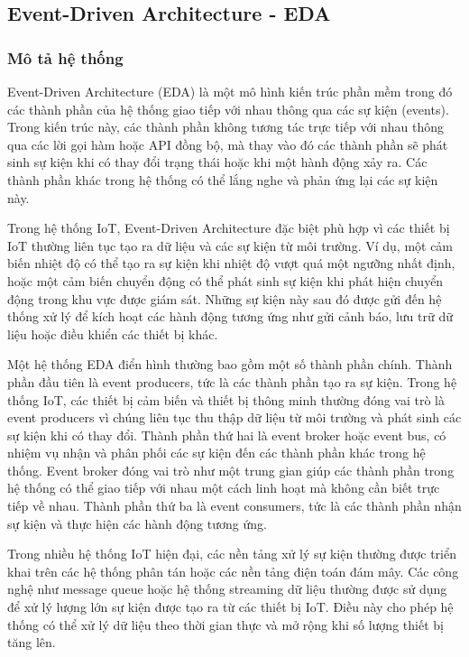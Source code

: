 \subsection{Event-Driven Architecture - EDA}

\subsubsection{Mô tả hệ thống}
Event-Driven Architecture (EDA) là một mô hình kiến trúc phần mềm trong đó các thành phần của hệ thống giao tiếp với nhau thông qua các sự kiện (events). Trong kiến trúc này, các thành phần không tương tác trực tiếp với nhau thông qua các lời gọi hàm hoặc API đồng bộ, mà thay vào đó các thành phần sẽ phát sinh sự kiện khi có thay đổi trạng thái hoặc khi một hành động xảy ra. Các thành phần khác trong hệ thống có thể lắng nghe và phản ứng lại các sự kiện này.

Trong hệ thống IoT, Event-Driven Architecture đặc biệt phù hợp vì các thiết bị IoT thường liên tục tạo ra dữ liệu và các sự kiện từ môi trường. Ví dụ, một cảm biến nhiệt độ có thể tạo ra sự kiện khi nhiệt độ vượt quá một ngưỡng nhất định, hoặc một cảm biến chuyển động có thể phát sinh sự kiện khi phát hiện chuyển động trong khu vực được giám sát. Những sự kiện này sau đó được gửi đến hệ thống xử lý để kích hoạt các hành động tương ứng như gửi cảnh báo, lưu trữ dữ liệu hoặc điều khiển các thiết bị khác.

Một hệ thống EDA điển hình thường bao gồm một số thành phần chính. Thành phần đầu tiên là event producers, tức là các thành phần tạo ra sự kiện. Trong hệ thống IoT, các thiết bị cảm biến và thiết bị thông minh thường đóng vai trò là event producers vì chúng liên tục thu thập dữ liệu từ môi trường và phát sinh các sự kiện khi có thay đổi. Thành phần thứ hai là event broker hoặc event bus, có nhiệm vụ nhận và phân phối các sự kiện đến các thành phần khác trong hệ thống. Event broker đóng vai trò như một trung gian giúp các thành phần trong hệ thống có thể giao tiếp với nhau một cách linh hoạt mà không cần biết trực tiếp về nhau. Thành phần thứ ba là event consumers, tức là các thành phần nhận sự kiện và thực hiện các hành động tương ứng.

Trong nhiều hệ thống IoT hiện đại, các nền tảng xử lý sự kiện thường được triển khai trên các hệ thống phân tán hoặc các nền tảng điện toán đám mây. Các công nghệ như message queue hoặc hệ thống streaming dữ liệu thường được sử dụng để xử lý lượng lớn sự kiện được tạo ra từ các thiết bị IoT. Điều này cho phép hệ thống có thể xử lý dữ liệu theo thời gian thực và mở rộng khi số lượng thiết bị tăng lên.

